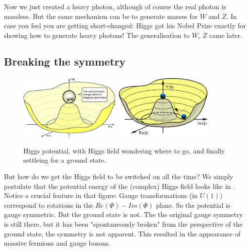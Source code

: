 Now we just created a heavy photon, although of course the real photon is massless. But the same mechanism can be to generate masses for $W$ and $Z$. In case you feel you are getting short-changed: Higgs got his Nobel Prize exactly for showing how to generate heavy photons! The generalisation to $W$, $Z$ came later.

\subsection{Breaking the symmetry}
\begin{figure}
\centering
\includegraphics[width=0.45\textwidth]{fig/higgs/phi_unstable.JPG}
\includegraphics[width=0.45\textwidth]{fig/HiggsAtBottom}
\caption{Higgs potential, with Higgs field wondering where to go, and finally settleing for a ground state.\label{fig:higgPotential}}
\end{figure}
But how do we get the Higgs field to be switched on all the time? We simply postulate that the potential energy of the (complex) Higgs field looks like in . Notice a crucial feature in that figure: Gauge transformations (in $U(1)$) correspond to rotations in the $Re(\Phi)-Im(\Phi)$ plane. So the potential is gauge symmetric. But the ground state is not. The the original gauge symmetry is still there, but it has been "spontaneously broken" from the perspective of the ground state, the symmetry is not apparent. This resulted in the appearance of massive fermions and gauge bosons.


